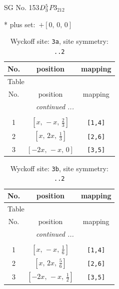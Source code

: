 \documentclass[fleqn,8pt]{jsarticle}
\begin{document}
\setcounter{MaxMatrixCols}{32}

\renewcommand{\tablename}{Table~}
\renewcommand{\figurename}{Figure~}
\begin{center}
\LARGE
SG No. 153\quad$D_{\rm 3}^{5}$\quad$P3_212$\quad[ trigonal ]
\end{center}
* plus set:\,\,\,$+\left[ 0,\, 0,\, 0 \right]$
\renewcommand{\arraystretch}{1.2}
\begin{longtable}{ccc}
\caption{Wyckoff site: {\tt 3a}, site symmetry: {\tt ..2}}
 \\
 \hline \hline
No. & position & mapping \\ \hline \endfirsthead

\multicolumn{2}{l}{\tablename\ \thetable{}} \\
 \hline \hline
No. & position & mapping \\ \hline \endhead

 \hline \hline
\multicolumn{2}{r}{\footnotesize\it continued ...} \\ \endfoot

 \hline \hline
\multicolumn{2}{r}{} \\ \endlastfoot

1 & $\left[ x,\, - x,\, \frac{2}{3} \right]$ & {\tt [1,4]} \\ \hline
2 & $\left[ x,\, 2 x,\, \frac{1}{3} \right]$ & {\tt [2,6]} \\ \hline
3 & $\left[ - 2 x,\, - x,\, 0 \right]$ & {\tt [3,5]} \\
\end{longtable}
\renewcommand{\arraystretch}{1.2}
\begin{longtable}{ccc}
\caption{Wyckoff site: {\tt 3b}, site symmetry: {\tt ..2}}
 \\
 \hline \hline
No. & position & mapping \\ \hline \endfirsthead

\multicolumn{2}{l}{\tablename\ \thetable{}} \\
 \hline \hline
No. & position & mapping \\ \hline \endhead

 \hline \hline
\multicolumn{2}{r}{\footnotesize\it continued ...} \\ \endfoot

 \hline \hline
\multicolumn{2}{r}{} \\ \endlastfoot

1 & $\left[ x,\, - x,\, \frac{1}{6} \right]$ & {\tt [1,4]} \\ \hline
2 & $\left[ x,\, 2 x,\, \frac{5}{6} \right]$ & {\tt [2,6]} \\ \hline
3 & $\left[ - 2 x,\, - x,\, \frac{1}{2} \right]$ & {\tt [3,5]} \\
\end{longtable}
\end{document}

